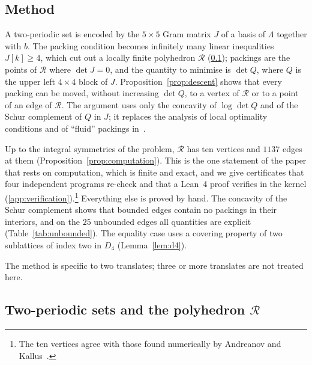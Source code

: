\documentclass[11pt,reqno]{amsart}
\renewcommand{\_}{\origunderscore\allowbreak}
\numberwithin{equation}{section}
\theoremstyle{plain}
\theoremstyle{definition}
\theoremstyle{remark}
\newcommand{\Rk}{\mathcal{R}}
\begin{document}
\subsection*{Method}
A two-periodic set is encoded by the $5\times5$ Gram matrix $J$ of a basis of $\Lambda$ together with $b$. The packing condition becomes infinitely many linear inequalities $J[k]\ge4$, which cut out a locally finite polyhedron $\Rk$ (\cref{sec:polyhedron}); packings are the points of $\Rk$ where $\det J=0$, and the quantity to minimise is $\det Q$, where $Q$ is the upper left $4\times4$ block of $J$. Proposition~\ref{prop:descent} shows that every packing can be moved, without increasing $\det Q$, to a vertex of $\Rk$ or to a point of an edge of $\Rk$. The argument uses only the concavity of $\log\det Q$ and of the Schur complement of $Q$ in $J$; it replaces the analysis of local optimality conditions and of ``fluid'' packings in~\cite[Theorem~3]{AK2020}.

Up to the integral symmetries of the problem, $\Rk$ has ten vertices and $1137$ edges at them (Proposition~\ref{prop:computation}). This is the one statement of the paper that rests on computation, which is finite and exact, and we give certificates that four independent programs re-check and that a Lean~4 proof verifies in the kernel (\cref{app:verification}).\footnote{The ten vertices agree with those found numerically by Andreanov and Kallus~\cite{AK2020}.} Everything else is proved by hand. The concavity of the Schur complement shows that bounded edges contain no packings in their interiors, and on the $25$ unbounded edges all quantities are explicit (Table~\ref{tab:unbounded}). The equality case uses a covering property of two sublattices of index two in $D_4$ (Lemma~\ref{lem:d4}).

The method is specific to two translates; three or more translates are not treated here.

\subsection{Two-periodic sets and the polyhedron \texorpdfstring{$\Rk$}{R}}\label{sec:polyhedron}
\end{document}
